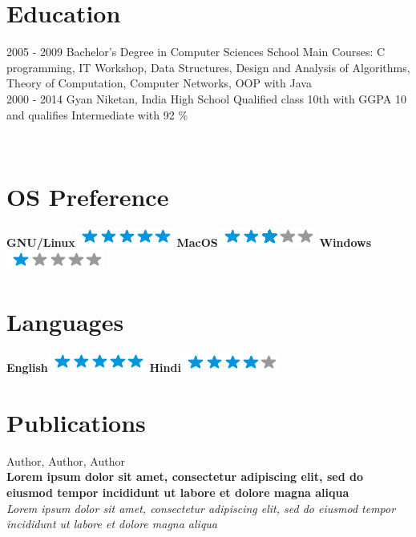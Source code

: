 \documentclass[]{friggeri-cv}
\begin{document}
\section{Education}
\begin{entrylist}
  \entry
    {2005 - 2009}
    {Bachelor's Degree in Computer Sciences}
    {School}
    {Main Courses: C programming, IT Workshop, Data Structures, Design and Analysis of Algorithms, Theory of Computation, Computer Networks, OOP with Java\\}
  \entry
    {2000 - 2014}
    {Gyan Niketan, India}
    {High School}
    {Qualified class 10th with GGPA 10 and qualifies Intermediate with 92 \%}
\end{entrylist}

\newpage

\begin{aside}
~
~
~
  \section{OS Preference}
    \textbf{GNU/Linux}\includegraphics[scale=0.40]{img/5stars.png}
    \textbf{MacOS}\includegraphics[scale=0.40]{img/3stars.png}
    \textbf{Windows}\includegraphics[scale=0.40]{img/1stars.png}
    ~
  \section{Languages}
    \textbf{English}\includegraphics[scale=0.40]{img/5stars.png}
    \textbf{Hindi}\includegraphics[scale=0.40]{img/4stars.png}
    ~
\end{aside}

\section{Publications}
Author, Author, Author\\
\textbf{Lorem ipsum dolor sit amet, consectetur adipiscing elit, sed do eiusmod tempor incididunt ut labore et dolore magna aliqua}\\
\emph{Lorem ipsum dolor sit amet, consectetur adipiscing elit, sed do eiusmod tempor incididunt ut labore et dolore magna aliqua}
\\
\end{document}
